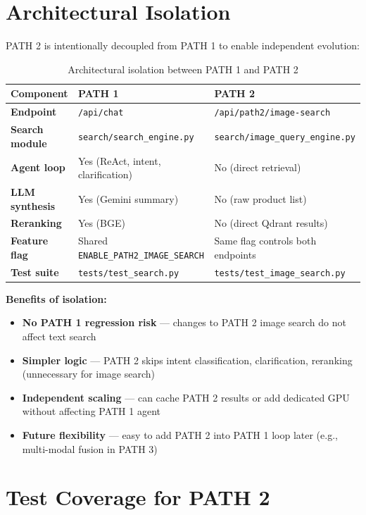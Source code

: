 \documentclass[12pt, twoside]{report}
\begin{document}
\section{Architectural Isolation}

PATH 2 is intentionally decoupled from PATH 1 to enable independent evolution:

\begin{table}[H]
\centering
\begin{tabular}{lll}
\toprule
\textbf{Component} & \textbf{PATH 1} & \textbf{PATH 2}\\
\midrule
\textbf{Endpoint} & \texttt{/api/chat} & \texttt{/api/path2/image-search} \\
\textbf{Search module} & \texttt{search/search\_engine.py} & \texttt{search/image\_query\_engine.py} \\
\textbf{Agent loop} & Yes (ReAct, intent, clarification) & No (direct retrieval) \\
\textbf{LLM synthesis} & Yes (Gemini summary) & No (raw product list) \\
\textbf{Reranking} & Yes (BGE) & No (direct Qdrant results) \\
\textbf{Feature flag} & Shared \texttt{ENABLE\_PATH2\_IMAGE\_SEARCH} & Same flag controls both endpoints \\
\textbf{Test suite} & \texttt{tests/test\_search.py} & \texttt{tests/test\_image\_search.py} \\
\bottomrule
\end{tabular}
\caption{Architectural isolation between PATH 1 and PATH 2}
\label{tab:path_isolation}
\end{table}

\textbf{Benefits of isolation:}
\begin{itemize}
    \item \textbf{No PATH 1 regression risk} --- changes to PATH 2 image search do not affect text search
    \item \textbf{Simpler logic} --- PATH 2 skips intent classification, clarification, reranking (unnecessary for image search)
    \item \textbf{Independent scaling} --- can cache PATH 2 results or add dedicated GPU without affecting PATH 1 agent
    \item \textbf{Future flexibility} --- easy to add PATH 2 into PATH 1 loop later (e.g., multi-modal fusion in PATH 3)
\end{itemize}

\section{Test Coverage for PATH 2}
\end{document}
